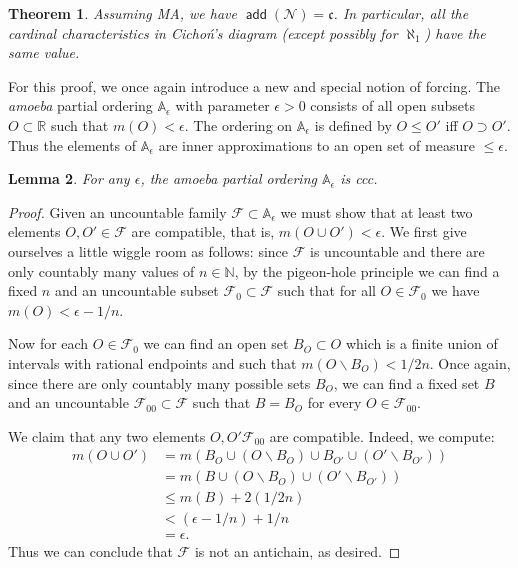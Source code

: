 \documentclass[11pt,oneside]{amsbook}
\newcommand{\NN}{\mathbb N}
\newcommand{\RR}{\mathbb R}
\newcommand{\Null}{\mathcal N}
\DeclareMathOperator{\add}{\mathsf{add}}
\theoremstyle{definition}
\theoremstyle{plain}
\newtheorem{thm}{Theorem}[section]
\newtheorem{lem}[thm]{Lemma}
\theoremstyle{definition}
\theoremstyle{remark}
\begin{document}
\begin{thm}
  \label{thm:ma-addn}
  Assuming MA, we have $\add(\Null)=\mathfrak c$. In particular, all the cardinal characteristics in Cicho\'n's diagram (except possibly for $\aleph_1$) have the same value.
\end{thm}

For this proof, we once again introduce a new and special notion of forcing. The \emph{amoeba} partial ordering $\mathbb A_\epsilon$ with parameter $\epsilon>0$ consists of all open subsets $O\subset\RR$ such that $m(O)<\epsilon$. The ordering on $\mathbb A_\epsilon$ is defined by $O\leq O'$ iff $O\supset O'$. Thus the elements of $\mathbb A_\epsilon$ are inner approximations to an open set of measure $\leq\epsilon$.

\begin{lem}
  For any $\epsilon$, the amoeba partial ordering $\mathbb A_\epsilon$ is ccc.
\end{lem}

\begin{proof}
  Given an uncountable family $\mathcal F\subset\mathbb A_\epsilon$ we must show that at least two elements $O,O'\in\mathcal F$ are compatible, that is, $m(O\cup O')<\epsilon$. We first give ourselves a little wiggle room as follows: since $\mathcal F$ is uncountable and there are only countably many values of $n\in\NN$, by the pigeon-hole principle we can find a fixed $n$ and an uncountable subset $\mathcal F_0\subset\mathcal F$ such that for all $O\in\mathcal F_0$ we have $m(O)<\epsilon-1/n$.

  Now for each $O\in\mathcal F_0$ we can find an open set $B_O\subset O$ which is a finite union of intervals with rational endpoints and such that $m(O\smallsetminus B_O)<1/2n$. Once again, since there are only countably many possible sets $B_O$, we can find a fixed set $B$ and an uncountable $\mathcal F_{00}\subset\mathcal F$ such that $B=B_O$ for every $O\in\mathcal F_{00}$.

  We claim that any two elements $O,O'\mathcal F_{00}$ are compatible. Indeed, we compute:
  \begin{align*}
    m(O\cup O')&=m(B_O\cup(O\smallsetminus B_O)\cup B_{O'}\cup(O'\smallsetminus B_{O'}))\\
    &=m(B\cup(O\smallsetminus B_O)\cup(O'\smallsetminus B_{O'}))\\
    &\leq m(B)+2(1/2n)\\
    &<(\epsilon-1/n)+1/n\\
    &=\epsilon\text{.}
  \end{align*}
  Thus we can conclude that $\mathcal F$ is not an antichain, as desired.
\end{proof}
\end{document}
